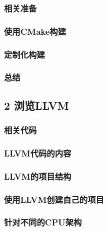 \documentclass[11pt,a4paper,UTF8]{ctexart}
\begin{document}
		\subsubsection*{ 相关准备}
		
		
		\subsubsection*{ 使用CMake构建}
		
		
		\subsubsection*{ 定制化构建}
		
		
		\subsubsection*{ 总结}
		
		
	\subsection{2 浏览LLVM}
		\subsubsection{相关代码}
		\subsubsection{LLVM代码的内容}
		\subsubsection{LLVM的项目结构}
		\subsubsection{使用LLVM创建自己的项目}
		\subsubsection{针对不同的CPU架构}
\end{document}
